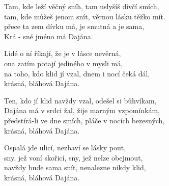 
\ve{}
Tam, kde leží věčný sníh, tam uslyšíš dívčí smích,\\
tam, kde můžeš jenom snít, věrnou lásku těžko mít.\\
přece ta zem dívku má, je smutná a je sama,\\
Krá - sné jméno má Dajána.  \quad {} \quad {}

\ve{}
Lidé o ní říkají, že je v lásce nevěrná,\\
ona zatím potají jediného v mysli má,\\
na toho, kdo klid jí vzal, dnem i nocí čeká dál,\\
krásná, bláhová Dajána.

\ve{}
Ten, kdo jí klid navždy vzal, odešel si bůhvíkam,\\
Dajána má v srdci žal, žije marným vzpomínkám,\\
předstírá-li ve dne smích, pláče v nocích bezesných,\\
krásná, bláhová Dajána.

\ve{}
Ospalá jde ulicí, nezbaví se lásky pout,\\
sny, jež voní skořicí, sny, jež nelze obejmout,\\
navždy bude sama snít, nenalezne nikdy klid,\\
krásná, bláhová Dajána.

\esong